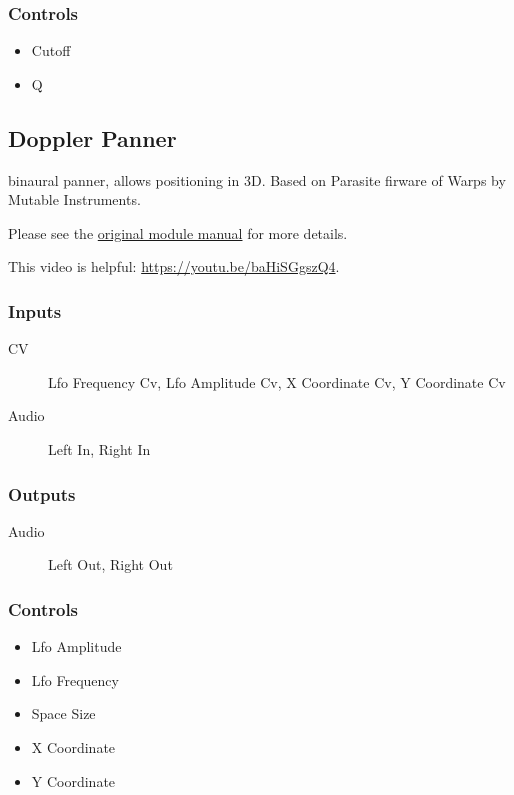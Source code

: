 \subsubsection{Controls}
\begin{itemize}
\item Cutoff
\item Q
\end{itemize}

\subsection{Doppler Panner}

binaural panner, allows positioning in 3D. Based on Parasite firware of Warps by Mutable Instruments.



Please see the \href{https://mqtthiqs.github.io/parasites/warps.html}{original module manual} for more details.

This video is helpful: \url{https://youtu.be/baHiSGgszQ4}.

\subsubsection{Inputs}
\begin{description}
\item [CV] Lfo Frequency Cv, Lfo Amplitude Cv, X Coordinate Cv, Y Coordinate Cv
\item [Audio] Left In, Right In
\end{description}

\subsubsection{Outputs}
\begin{description}
\item [Audio] Left Out, Right Out
\end{description}

\subsubsection{Controls}
\begin{itemize}
\item Lfo Amplitude
\item Lfo Frequency
\item Space Size
\item X Coordinate
\item Y Coordinate
\end{itemize}

